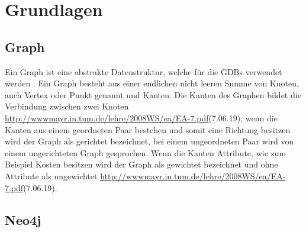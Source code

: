 
\chapter{Grundlagen} %

\label{Kaptiel 2} %

\section{Graph}

Ein Graph ist eine abstrakte Datenstruktur, welche für die GDBs verwendet werden \parencite{vicknair2010comparison}. Ein Graph besteht aus einer endlichen nicht leeren Summe von Knoten, auch Vertex oder Punkt genannt und Kanten. Die Kanten des Graphen bildet die Verbindung zwischen zwei Knoten \url{ http://wwwmayr.in.tum.de/lehre/2008WS/ea/EA-7.pdf}(7.06.19), wenn die Kanten aus einem geordneten Paar bestehen und somit eine Richtung besitzen wird der Graph als gerichtet bezeichnet, bei einem ungeordneten Paar wird von einem ungerichteten Graph gesprochen\parencite{bondy1976graph}. Wenn die Kanten Attribute, wie zum Beispiel Kosten besitzen wird der Graph als gewichtet bezeichnet und ohne Attribute als ungewichtet  \url{ http://wwwmayr.in.tum.de/lehre/2008WS/ea/EA-7.pdf}(7.06.19). 

\section{Neo4j}


